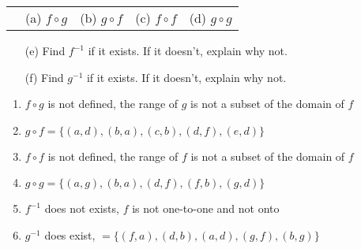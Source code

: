 \begin{tabular}{p{0.5in}llll}
  & (a) $f \circ g$ \hspace{0.3in} & (b) $g \circ f$ \hspace{0.3in} & (c) $f
\circ f$ \hspace{0.3in} & (d) $g \circ g$
\end{tabular}
\begin{itemize}[itemsep=0pt,parsep=0pt,topsep=0pt,partopsep=0pt]
    \item[(e)] Find $f^{-1}$ if it exists. If it doesn't, explain why not.
    \item[(f)] Find $g^{-1}$ if it exists. If it doesn't, explain why not.
\end{itemize}
   \ifprintanswers
        \vspace{-5pt}
   \fi
	\begin{solution}
	\begin{enumerate}[label=(\alph*),itemsep=3pt,parsep=0pt,topsep=0pt,partopsep=0pt]
		\item $f \circ g$ is not defined, the range of $g$ is not a subset of the domain of $f$
		\item $g \circ f = \{ (a,d), (b,a), (c,b), (d,f), (e,d) \}$
		\item $f \circ f$ is not defined, the range of $f$ is not a subset of the domain of $f$
		\item $g \circ g = \{ (a,g), (b,a), (d,f), (f,b), (g,d) \}$
		\item $f^{-1}$ does not exists, $f$ is not one-to-one and not onto
		\item $g^{-1}$ does exist, $= \{ (f,a), (d,b), (a,d), (g,f), (b,g) \}$
	\end{enumerate}
	\end{solution}



